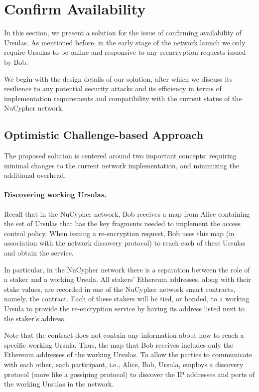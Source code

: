 \section{Confirm Availability}
In this section, we present a solution for the issue of confirming availability of 
Ursulas. As mentioned before, in the early stage of the network launch we only 
require Ursulas to be online and responsive to any reencryption 
requests issued by Bob. 


We begin with the design details of our solution, after which we discuss its 
resilience to any potential security attacks and its efficiency in terms of implementation 
requirements and compatibility with the current status of the NuCypher network.


\subsection{Optimistic Challenge-based Approach}
The proposed solution is centered around two important concepts: requiring minimal 
changes to the current network implementation, and minimizing the additional overhead. 


\paragraph{Discovering working Ursulas.} Recall that in the NuCypher network, Bob receives a map from Alice containing 
the set of Ursulas that has the key fragments needed to implement the access control policy. 
When issuing a re-encryption request, Bob uses this map (in association with the network discovery protocol) to reach each of these Ursulas and obtain 
the service. 


In particular, in the NuCypher network there is a separation between the role of a staker and a working Ursula. All stakers' Ethereum addresses, along with their stake values, are recorded in one of the NuCypher network smart contracts, namely, the \stakeescrow contract. Each of these stakers will be tied, or bonded, to a working Ursula to provide the re-encryption service by having its address listed next to the staker's address. 


Note that the \stakeescrow contract does not contain any information about how to reach a specific working Ursula. Thus, the map that Bob receives includes only the Ethereum addresses of the working Ursulas. To allow the parties to communicate with each other, each participant, i.e., Alice, Bob, Ursula, employs a discovery protocol (more like a gossiping protocol) to discover the IP addresses and ports of the working Ursulas in the network.  


